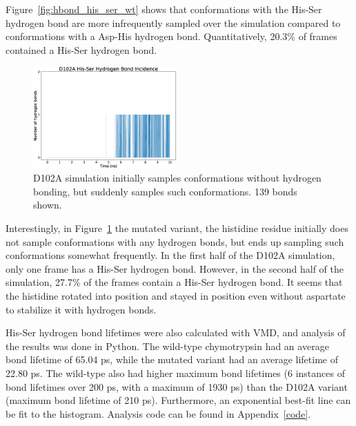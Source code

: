 \documentclass[11pt, twocolumn]{article}
\begin{document}
Figure~\ref{fig:hbond_his_ser_wt} shows that conformations with the His-Ser
hydrogen bond are more infrequently sampled over the simulation compared to
conformations with a Asp-His hydrogen bond. Quantitatively, 20.3\% of frames
contained a His-Ser hydrogen bond.

\begin{figure}[H]
    \centering
        \includegraphics[width=0.49\textwidth]{d102a_hbonds_his_ser.eps}
    \caption{D102A simulation initially samples conformations without hydrogen
        bonding, but suddenly samples such conformations. 139 bonds shown.
        }\label{fig:hbond_his_ser_d102a}
\end{figure}


Interestingly, in
Figure~\ref{fig:hbond_his_ser_d102a} the mutated variant, the histidine
residue initially does not sample conformations with any hydrogen bonds, but
ends up sampling such conformations somewhat frequently. In the first half
of the D102A simulation, only one frame has a His-Ser hydrogen bond. However,
in the second half of the simulation, 27.7\% of the frames contain a His-Ser
hydrogen bond. It seems that the histidine rotated into position and stayed
in position even without aspartate to stabilize it with hydrogen bonds.


His-Ser hydrogen bond lifetimes were also calculated with VMD, and analysis
of the results was done in Python. The wild-type chymotrypsin had an average
bond lifetime of 65.04 ps, while the mutated variant had an average lifetime
of 22.80 ps. The wild-type also had higher maximum bond lifetimes (6 instances
of bond lifetimes over 200 ps, with a maximum of 1930 ps) than the D102A
variant (maximum bond lifetime of 210 ps). Furthermore, an exponential
best-fit line can be fit to the histogram.
Analysis code can be found in Appendix~\ref{code}.
\end{document}
